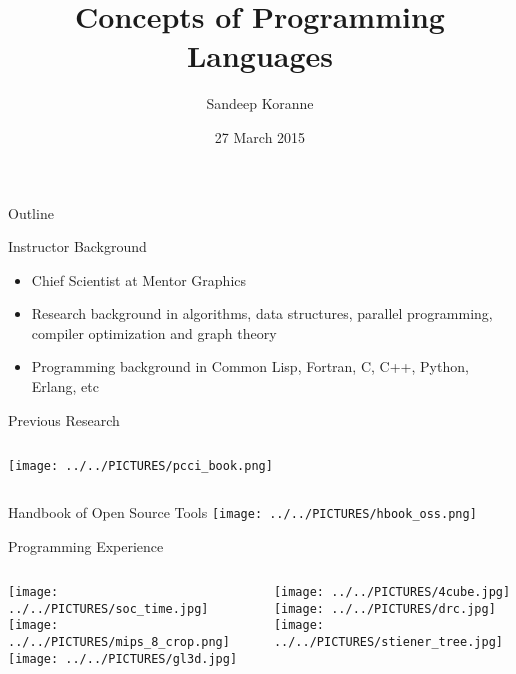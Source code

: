 \documentclass[bigger]{beamer}
\author{Sandeep Koranne}
\date{27 March 2015}
\title{Concepts of Programming Languages}
\begin{document}
\maketitle
\begin{frame}{Outline}
\tableofcontents
\end{frame}


\begin{frame}[label=sec-1]{Instructor Background}
\begin{itemize}
\item Chief Scientist at Mentor Graphics
\item Research background in algorithms, data structures, parallel programming, compiler optimization and graph theory
\item Programming background in Common Lisp, Fortran, C, C++, Python, Erlang, etc
\end{itemize}
\end{frame}

\begin{frame}[label=sec-2]{Previous Research}
\begin{columns}
\begin{column}{0.5\textwidth}
\texttt{[image: ../../PICTURES/pcci\_book.png]}
\end{column}
\end{columns}
\begin{block}{Handbook of Open Source Tools}
\texttt{[image: ../../PICTURES/hbook\_oss.png]}
\end{block}
\end{frame}

\begin{frame}[label=sec-3]{Programming Experience}
\begin{columns}
\begin{column}{0.3\textwidth}
\texttt{[image: ../../PICTURES/soc\_time.jpg]}
\texttt{[image: ../../PICTURES/mips\_8\_crop.png]}
\texttt{[image: ../../PICTURES/gl3d.jpg]}
\end{column}
\begin{column}{0.3\textwidth}
\texttt{[image: ../../PICTURES/4cube.jpg]}
\texttt{[image: ../../PICTURES/drc.jpg]}
\texttt{[image: ../../PICTURES/stiener\_tree.jpg]}
\end{column}
\end{columns}
\end{frame}
\end{document}
